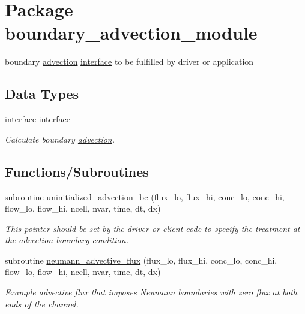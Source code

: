 \hypertarget{a00050}{
\section{Package boundary\_\-advection\_\-module}
\label{a00050}
}
boundary \hyperlink{a00049}{advection} \hyperlink{a00003}{interface} to be fulfilled by driver or application  


\subsection*{Data Types}
\begin{CompactItemize}
\item 
interface \hyperlink{a00003}{interface}
\begin{CompactList}\small\item\em Calculate boundary \hyperlink{a00049}{advection}. \item\end{CompactList}\end{CompactItemize}
\subsection*{Functions/Subroutines}
\begin{CompactItemize}
\item 
subroutine \hyperlink{a00050_26eb82e9a6eae1dd87145fafd01bd2ae}{uninitialized\_\-advection\_\-bc} (flux\_\-lo, flux\_\-hi, conc\_\-lo, conc\_\-hi, flow\_\-lo, flow\_\-hi, ncell, nvar, time, dt, dx)
\begin{CompactList}\small\item\em This pointer should be set by the driver or client code to specify the treatment at the \hyperlink{a00049}{advection} boundary condition. \item\end{CompactList}\item 
subroutine \hyperlink{a00050_be28f15b0eabbed1d1f745d2e27cbdc7}{neumann\_\-advective\_\-flux} (flux\_\-lo, flux\_\-hi, conc\_\-lo, conc\_\-hi, flow\_\-lo, flow\_\-hi, ncell, nvar, time, dt, dx)
\begin{CompactList}\small\item\em Example advective flux that imposes Neumann boundaries with zero flux at both ends of the channel. \item\end{CompactList}\end{CompactItemize}


